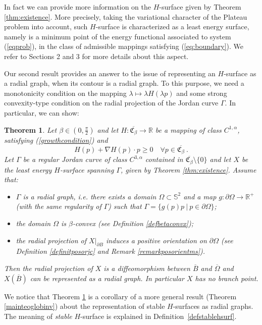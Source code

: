 \documentclass[a4paper,reqno,10pt,oneside]{amsart}
\numberwithin{equation}{section}
\newtheorem{theorem}{Theorem}[section]
\begin{document}
In fact we can provide more information on the $H$-surface given by Theorem \ref{thm:existence}. More precisely, taking the variational character of the Plateau problem into account, such $H$-surface is  characterized as a least energy surface, namely is a minimum point of the energy functional 
associated to system (\ref{eqprob}), in the class of admissible mappings 
satisfying (\ref{eq:boundary}). We refer to Sections 2 and 3 for more details about this aspect.

Our second result provides an answer to the issue of representing an $H$-surface as a radial graph, when its contour is a radial graph. To this purpose, we need a monotonicity condition on the mapping $\lambda\mapsto \lambda H(\lambda p)$ and some strong convexity-type condition on the radial projection of the Jordan curve $\Gamma$. In particular, we can show:

\begin{theorem}
\label{thm:radial-graph}
Let $\beta\in(0,\frac{\pi}{2})$ and let $H\colon\overline{\mathfrak{C}_{\beta}}\to{\mathbb R}$ be a mapping of class $C^{1,\alpha}$, satisfying (\ref{growthcondition}) and 
\begin{equation}
\label{monassumption}
H(p)+\nabla H(p)\cdot p{\geqslant} 0\quad\forall p\in\overline{{\mathfrak{C}}_{\beta}}~\!.
\end{equation}
Let $\Gamma$ be a regular Jordan curve of class $C^{3,\alpha}$ contained in $\overline{\mathfrak{C}_{\beta}}\setminus\{0\}$ and let $X$ be the least energy $H$-surface spanning $\Gamma$, given by Theorem \ref{thm:existence}. Assume that:
\begin{itemize}
\item[(i)] $\Gamma$ is a radial graph, i.e. there exists a domain $\Omega\subset\mathbb{S}^{2}$ and a map $g\colon\partial\Omega\to{\mathbb R}^{+}$ (with the same regularity of $\Gamma$) such that $\Gamma=\{g(p)p~|~p\in\partial\Omega\}$;
\item[(ii)] the domain $\Omega$ is $\beta$-convex (see Definition \ref{defbetaconvx});
\item[(iii)] the radial projection of $X|_{\partial B}$ induces a positive orientation on $\partial\Omega$ (see Definition \ref{definitposorjc} and  Remark \ref{remarkposorientms}).
\end{itemize} 
Then the radial projection of $X$ is a diffeomorphism between $\overline{B}$ and $\overline\Omega$ and $X(\overline{B})$ can be represented as a radial graph. In particular $X$ has no branch point.  
\end{theorem}
\noindent
We notice that Theorem \ref{thm:radial-graph} is a corollary of a more general result (Theorem \ref{mainteoglobinv}) about the representation of stable $H$-surfaces as radial graphs. The meaning of \emph{stable} $H$-surface is explained in Definition~\ref{defstablehsurf}.
\end{document}
